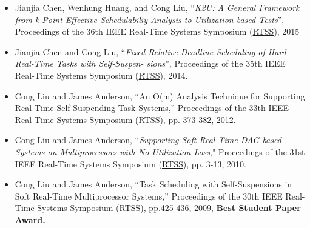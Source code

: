 \documentclass[10pt,letterpaper]{article}
\begin{document}
	\begin{itemize}
	




\item
Jianjia Chen, Wenhung Huang, and Cong Liu, ``\textit{K2U: A General Framework from k-Point Effective Schedulabiliy Analysis to Utilization-based Tests}'', Proceedings of the 36th IEEE Real-Time Systems Symposium (\underline{RTSS}), 2015

\item
Jianjia Chen and Cong Liu, ``\textit{Fixed-Relative-Deadline Scheduling of Hard Real-Time Tasks with Self-Suspen- sions}'', Proceedings of the 35th IEEE Real-Time Systems Symposium (\underline{RTSS}), 2014.




\item 	Cong Liu and James Anderson, ``An O(m) Analysis Technique for Supporting Real-Time Self-Suspending Task Systems,'' Proceedings of the 33th IEEE Real-Time Systems Symposium (\underline{RTSS}), pp. 373-382, 2012.


\item 	Cong Liu and James Anderson, ``\textit{Supporting Soft Real-Time DAG-based Systems on Multiprocessors with No Utilization Loss}," Proceedings of the 31st IEEE Real-Time Systems Symposium (\underline{RTSS}), pp. 3-13, 2010.


\item Cong Liu and James Anderson, ``Task Scheduling with Self-Suspensions in Soft Real-Time Multiprocessor Systems,'' Proceedings of the 30th IEEE Real-Time Systems Symposium (\underline{RTSS}), pp.425-436, 2009,  \textbf{Best Student Paper Award.}

\end{itemize}
	
\newpage 
\end{document}
